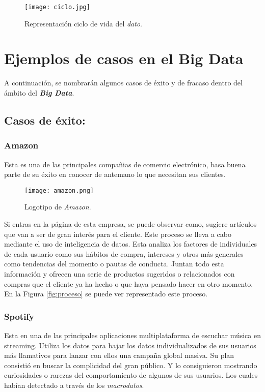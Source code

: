\documentclass[11pt]{diazessay} %
\begin{document}
\begin{figure}[h!]
	\centering
	\texttt{[image: ciclo.jpg]}
	\caption{Representación ciclo de vida del \textit{dato}.}
	\label{fig:ciclo-dato}
\end{figure}


\newpage
\section*{Ejemplos de casos en el Big Data}
A continuación, se nombrarán algunos casos de éxito y de fracaso dentro del ámbito del \textit{\textbf{Big Data}}.\\

\subsection*{Casos de éxito:}

\subsubsection*{Amazon}
Esta es una de las principales compañias de comercio electrónico, basa buena parte de su éxito en conocer de antemano lo que necesitan sus clientes.

\begin{figure}[h!]
	\centering
	\texttt{[image: amazon.png]}
	\caption{Logotipo de \textit{Amazon}.}
	\label{fig:amazon}
\end{figure}

Si entras en la página de esta empresa, se puede observar como, sugiere artículos que van a ser de gran interés para el cliente. Este proceso se lleva a cabo mediante el uso de inteligencia de datos. Esta analiza los factores de individuales de cada usuario como sus hábitos de compra, intereses y otros más generales como tendencias del momento o pautas de conducta. Juntan todo esta información y ofrecen una serie de productos sugeridos o relacionados con compras que el cliente ya ha hecho o que haya pensado hacer en otro momento.\\
En la Figura \ref{fig:proceso} se puede ver representado este proceso.\\


\subsubsection*{Spotify}
Esta en una de las principales aplicaciones multiplataforma de escuchar música en streaming. Utiliza los datos para bajar los datos individualizados de sus usuarios más llamativos para lanzar con ellos una campaña global masiva. Su plan consistió en buscar la complicidad del gran público. Y lo consiguieron mostrando curiosidades o rarezas del comportamiento de algunos de sus usuarios. Los cuales habían detectado a través de los \textit{macrodatos}.\\
\end{document}
